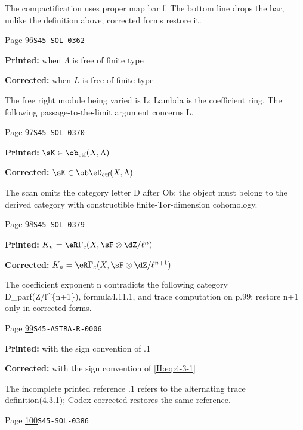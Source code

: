 \begin{description}
\par\noindent The compactification uses proper map bar f. The bottom line drops the bar, unlike the definition above; corrected forms restore it.
\smallskip
\item[\hypertarget{apparatus:EN-0037}{37}] Page \hyperlink{printpage:en:96}{96}\quad\texttt{S45-SOL-0362}
\par\noindent\textbf{Printed:} when $\Lambda$ is free of finite type
\par\noindent\textbf{Corrected:} when $L$ is free of finite type
\par\noindent The free right module being varied is L; Lambda is the coefficient ring. The following passage-to-the-limit argument concerns L.
\smallskip
\item[\hypertarget{apparatus:EN-0038}{38}] Page \hyperlink{printpage:en:97}{97}\quad\texttt{S45-SOL-0370}
\par\noindent\textbf{Printed:} \(\sK\in\ob_{\text{ctf}}(X,\Lambda)\)
\par\noindent\textbf{Corrected:} \(\sK\in\ob\eD_\text{ctf}(X,\Lambda)\)
\par\noindent The scan omits the category letter D after Ob; the object must belong to the derived category with constructible finite-Tor-dimension cohomology.
\smallskip
\item[\hypertarget{apparatus:EN-0039}{39}] Page \hyperlink{printpage:en:98}{98}\quad\texttt{S45-SOL-0379}
\par\noindent\textbf{Printed:} $K_n=\eR\Gamma_c(X,\sF\otimes\dZ/\ell^n)$
\par\noindent\textbf{Corrected:} $K_n=\eR\Gamma_c(X,\sF\otimes\dZ/\ell^{n+1})$
\par\noindent The coefficient exponent n contradicts the following category D\_parf(Z/l\textasciicircum{}\{n+1\}), formula4.11.1, and trace computation on p.99; restore n+1 only in corrected forms.
\smallskip
\item[\hypertarget{apparatus:EN-0040}{40}] Page \hyperlink{printpage:en:99}{99}\quad\texttt{S45-ASTRA-R-0006}
\par\noindent\textbf{Printed:} with the sign convention of .1
\par\noindent\textbf{Corrected:} with the sign convention of \ref{II:eq:4-3-1}
\par\noindent The incomplete printed reference .1 refers to the alternating trace definition(4.3.1); Codex corrected restores the same reference.
\smallskip
\item[\hypertarget{apparatus:EN-0041}{41}] Page \hyperlink{printpage:en:100}{100}\quad\texttt{S45-SOL-0386}

\end{description}
